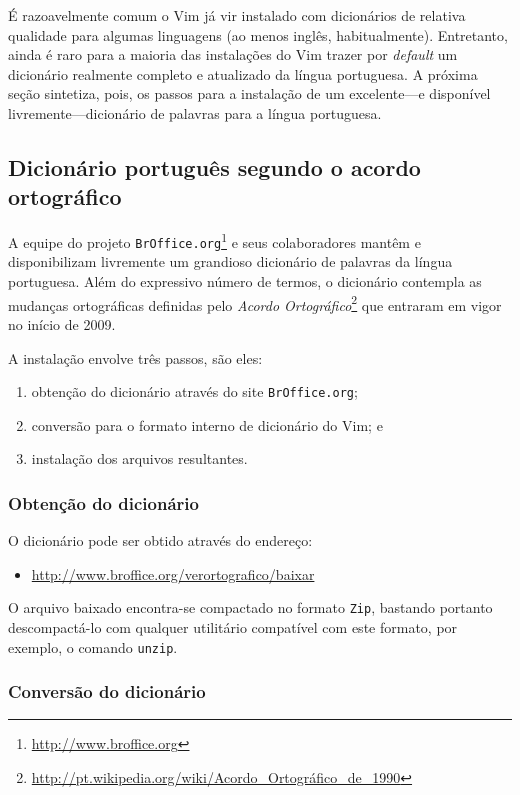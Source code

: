 É razoavelmente comum o Vim já vir instalado com dicionários de relativa
qualidade para algumas linguagens (ao menos inglês, habitualmente).
Entretanto, ainda é raro para a maioria das instalações do Vim trazer por {\em
default} um dicionário realmente completo e atualizado da língua portuguesa. A
próxima seção sintetiza, pois, os passos para a instalação de um excelente---e
disponível livremente---dicionário de palavras para a língua portuguesa.

\subsection{Dicionário português segundo o acordo ortográfico}

A equipe do projeto {\tt BrOffice.org}\footnote{\url{http://www.broffice.org}}
e seus colaboradores mantêm e disponibilizam livremente um grandioso dicionário
de palavras da língua portuguesa. Além do expressivo número de termos, o
dicionário contempla as mudanças ortográficas definidas pelo {\em Acordo
Ortográfico}\footnote{\url{http://pt.wikipedia.org/wiki/Acordo_Ortográfico_de_1990}}
que entraram em vigor no início de 2009.

A instalação envolve três passos, são eles: 
\begin{enumerate}
     \item obtenção do dicionário através do site {\tt BrOffice.org}; 
     \item conversão para o formato interno de dicionário do Vim; e 
     \item instalação dos arquivos resultantes.
\end{enumerate}

\subsubsection{Obtenção do dicionário}

O dicionário pode ser obtido através do endereço: 
\begin{itemize}
\item[] \url{http://www.broffice.org/verortografico/baixar}
\end{itemize}

O arquivo baixado encontra-se compactado no formato {\tt Zip}, bastando
portanto descompactá-lo com qualquer utilitário compatível com este formato,
por exemplo, o comando {\tt unzip}.

\subsubsection{Conversão do dicionário}

